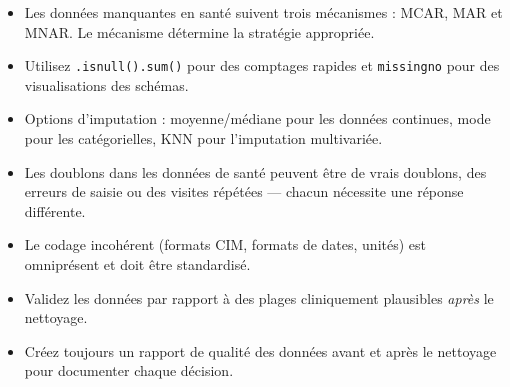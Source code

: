 \begin{itemize}
  \item Les donn\'ees manquantes en sant\'e suivent trois m\'ecanismes : MCAR, MAR et MNAR. Le m\'ecanisme d\'etermine la strat\'egie appropri\'ee.
  \item Utilisez \texttt{.isnull().sum()} pour des comptages rapides et \texttt{missingno} pour des visualisations des sch\'emas.
  \item Options d'imputation : moyenne/m\'ediane pour les donn\'ees continues, mode pour les cat\'egorielles, KNN pour l'imputation multivari\'ee.
  \item Les doublons dans les donn\'ees de sant\'e peuvent \^etre de vrais doublons, des erreurs de saisie ou des visites r\'ep\'et\'ees --- chacun n\'ecessite une r\'eponse diff\'erente.
  \item Le codage incoh\'erent (formats CIM, formats de dates, unit\'es) est omnipr\'esent et doit \^etre standardis\'e.
  \item Validez les donn\'ees par rapport \`a des plages cliniquement plausibles \emph{apr\`es} le nettoyage.
  \item Cr\'eez toujours un rapport de qualit\'e des donn\'ees avant et apr\`es le nettoyage pour documenter chaque d\'ecision.
\end{itemize}
